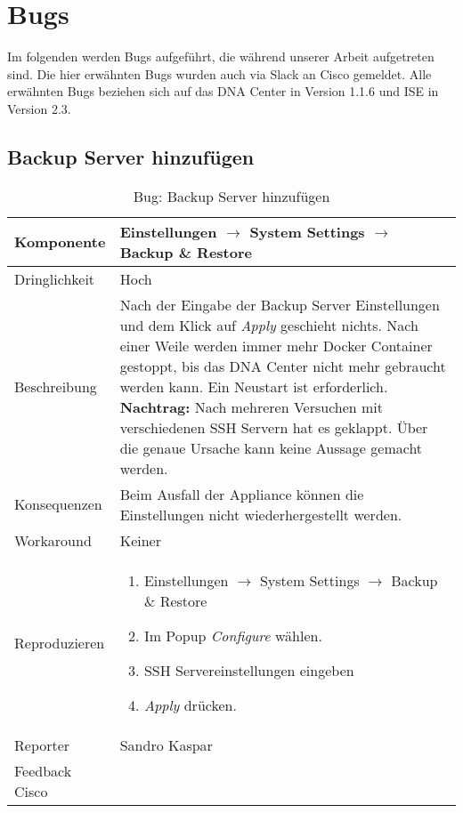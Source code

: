 \section{Bugs}
Im folgenden werden Bugs aufgeführt, die während unserer Arbeit aufgetreten sind. Die hier erwähnten Bugs wurden auch via Slack an Cisco gemeldet. Alle erwähnten Bugs beziehen sich auf das DNA Center in Version 1.1.6 und ISE in Version 2.3.

\newcommand{\bugreport}[9]{
\subsection{#1}
	\begin{table}[H]
		\rowcolors{2}{gray!25}{white}
		\centering
		\begin{tabularx}{\textwidth}{| l | X |}
			\hline
			Komponente   & #2       \\
			\hline
			Dringlichkeit   & #3       \\
			\hline
			Beschreibung   & #4  \\ 
			\hline
			Konsequenzen   & #5  \\ 
			\hline
			Workaround & #6 \\
			\hline
			Reproduzieren & #7	\\
			\hline
			Reporter  & #8 \\
			\hline
			Feedback Cisco & #9 \\
			\hline
		\end{tabularx}
		\caption{Bug: #1}
	\end{table}
}

\bugreport
{Backup Server hinzufügen}
{Einstellungen $\rightarrow$ System Settings $\rightarrow$ Backup \& Restore}
{Hoch}
{Nach der Eingabe der Backup Server Einstellungen und dem Klick auf \textit{Apply} geschieht nichts. Nach einer Weile werden immer mehr Docker Container gestoppt, bis das DNA Center nicht mehr gebraucht werden kann. Ein Neustart ist erforderlich.
\textbf{Nachtrag:} Nach mehreren Versuchen mit verschiedenen SSH Servern hat es geklappt. Über die genaue Ursache kann keine Aussage gemacht werden.
}
{Beim Ausfall der Appliance können die Einstellungen nicht wiederhergestellt werden.}
{Keiner}
{
	\begin{enumerate}
		\item Einstellungen $\rightarrow$ System Settings $\rightarrow$ Backup \& Restore
		\item Im Popup \textit{Configure} wählen. 
		\item SSH Servereinstellungen eingeben
		\item \textit{Apply} drücken. 
	\end{enumerate}
}
{Sandro Kaspar}
{}

